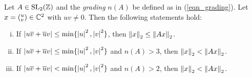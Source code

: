 \begin{theorem}
\label{thm_SL2FunDomGlobMin}
Let $A \in \operatorname{SL}_{2}(\mathbb{Z})$ and the \emph{grading} $n(A)$ be defined as in (\ref{eqn_grading}). Let $x = ({}^u_v) \in \mathbb{C}^2$ with $uv \ne 0$. Then the following statements hold:
\begin{enumerate}[(i)]
\item \label{itm_SL2FunDomGlobMinA}
If $\left|u\overline{v} + \overline{u}v\right| \le \min\{\left|u\right|^2,\left|v\right|^2\}$, then $\left\| x \right\|_2 \le \left\| Ax \right\|_2$.
\item \label{itm_SL2FunDomGlobMinB}
If $\left|u\overline{v} + \overline{u}v\right| \le \min\{\left|u\right|^2,\left|v\right|^2\}$ and $n(A) > 3$, then $\left\| x \right\|_2 < \left\| Ax \right\|_2$.
\item \label{itm_SL2FunDomGlobMinC}
If $\left|u\overline{v} + \overline{u}v\right| < \min\{\left|u\right|^2,\left|v\right|^2\}$ and $n(A) > 2$, 
then $\left\| x \right\|_2 < \left\| Ax \right\|_2$.
\end{enumerate}
\end{theorem}
